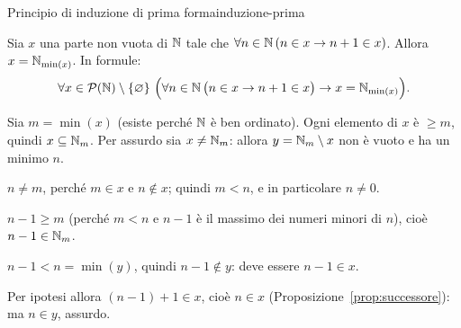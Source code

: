 \begin{concetto}
\begin{Teorema}{Principio di induzione di prima forma}{induzione-prima}
    \begin{prerequisiti}
    \end{prerequisiti}
    Sia $x$ una parte non vuota di $\mathbb{N}$ tale che $\forall n \in \mathbb{N}\,(n \in x \rightarrow n + 1 \in x)$. Allora $x = \mathbb{N}_{\min(x)}$. In formule:
    \[ \forall x \in \mathcal{P}(\mathbb{N}) \setminus \{\varnothing\}\ \Big(\forall n \in \mathbb{N}\,\big(n \in x \rightarrow n + 1 \in x\big) \rightarrow x = \mathbb{N}_{\min(x)}\Big). \]
\end{Teorema}
\begin{dimostrazione}
    Sia $m = \min(x)$ (esiste perché $\mathbb{N}$ è ben ordinato). Ogni elemento di $x$ è $\geq m$, quindi $x \subseteq \mathbb{N}_m$.
    Per assurdo sia $x \neq \mathbb{N}_m$: allora $y = \mathbb{N}_m \setminus x$ non è vuoto e ha un minimo $n$.
    \begin{passi}
        \item $n \neq m$, perché $m \in x$ e $n \notin x$; quindi $m < n$, e in particolare $n \neq 0$.
        \item $n - 1 \geq m$ (perché $m < n$ e $n - 1$ è il massimo dei numeri minori di $n$), cioè $n - 1 \in \mathbb{N}_m$.
        \item $n - 1 < n = \min(y)$, quindi $n - 1 \notin y$: deve essere $n - 1 \in x$.
        \item Per ipotesi allora $(n - 1) + 1 \in x$, cioè $n \in x$ (Proposizione~\ref{prop:successore}): ma $n \in y$, assurdo.
    \end{passi}
\end{dimostrazione}
\end{concetto}

